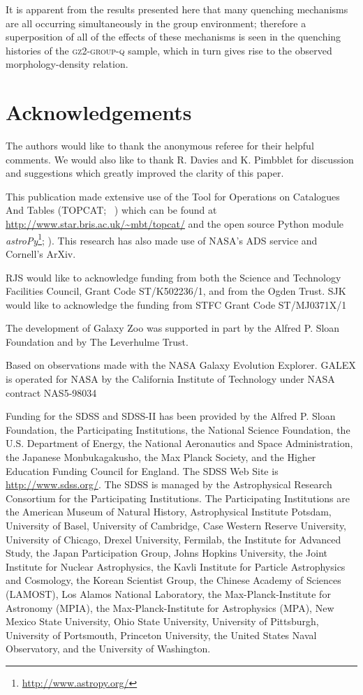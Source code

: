 \documentclass[useAMS,usenatbib]{mn2e}
\def\minor		{\color{minorcol}}
\begin{document}
It is apparent from the results presented here that many quenching mechanisms are all occurring simultaneously in the group environment; therefore a superposition of all of the effects of these mechanisms is seen in the quenching histories of the \textsc{gz2-group-q} sample, which in turn gives rise to the observed morphology-density relation. 

\section*{Acknowledgements}
{\minor The authors would like to thank the anonymous referee for their helpful comments.} We would also like to thank R. Davies and K. Pimbblet for discussion and suggestions which greatly improved the clarity of this paper. 

This publication made extensive use of the Tool for Operations on Catalogues And Tables (TOPCAT; ~\citealt{taylor05}) which can be found at \url{http://www.star.bris.ac.uk/~mbt/topcat/} and the open source Python module \emph{astroPy}\footnote{\url{http://www.astropy.org/}}; \citealt{astropy13}). This research has also made use of NASA's ADS service and Cornell's ArXiv. 

RJS would like to acknowledge funding from both the Science and Technology Facilities Council, Grant Code ST/K502236/1, and from the Ogden Trust. SJK would like to acknowledge the funding from STFC Grant Code ST/MJ0371X/1

The development of Galaxy Zoo was supported in part by the Alfred P. Sloan Foundation and by The Leverhulme Trust. 

Based on observations made with the NASA Galaxy Evolution Explorer.  GALEX is operated for NASA by the California Institute of Technology under NASA contract NAS5-98034

Funding for the SDSS and SDSS-II has been provided by the Alfred P. Sloan Foundation, the Participating Institutions, the National Science Foundation, the U.S. Department of Energy, the National Aeronautics and Space Administration, the Japanese Monbukagakusho, the Max Planck Society, and the Higher Education Funding Council for England. The SDSS Web Site is \url{http://www.sdss.org/}.
The SDSS is managed by the Astrophysical Research Consortium for the Participating Institutions. The Participating Institutions are the American Museum of Natural History, Astrophysical Institute Potsdam, University of Basel, University of Cambridge, Case Western Reserve University, University of Chicago, Drexel University, Fermilab, the Institute for Advanced Study, the Japan Participation Group, Johns Hopkins University, the Joint Institute for Nuclear Astrophysics, the Kavli Institute for Particle Astrophysics and Cosmology, the Korean Scientist Group, the Chinese Academy of Sciences (LAMOST), Los Alamos National Laboratory, the Max-Planck-Institute for Astronomy (MPIA), the Max-Planck-Institute for Astrophysics (MPA), New Mexico State University, Ohio State University, University of Pittsburgh, University of Portsmouth, Princeton University, the United States Naval Observatory, and the University of Washington.



  
\end{document}
